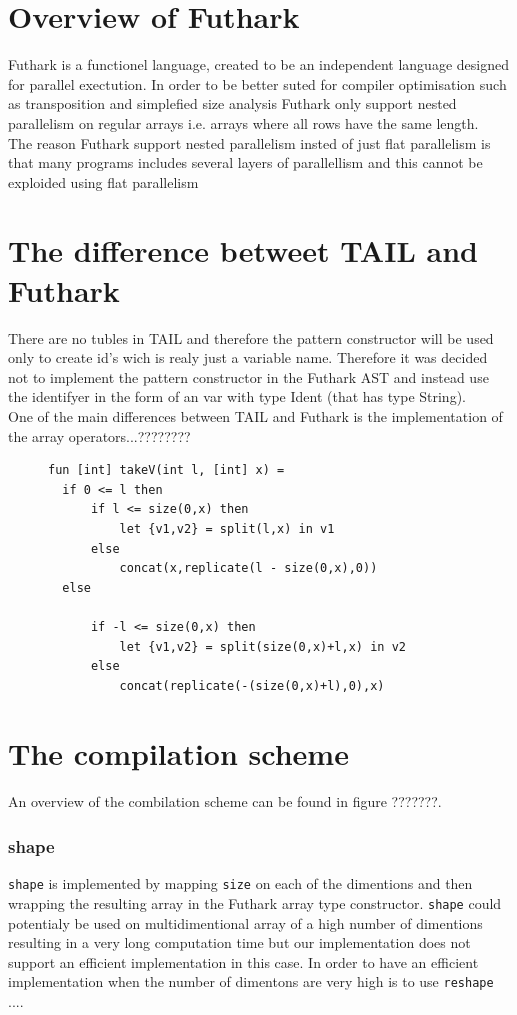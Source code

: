 \documentclass[11pt]{article}
\begin{document}
\section{Overview of Futhark}
Futhark is a functionel language, created to be an independent language designed for parallel exectution. In order to be better suted for compiler optimisation such as transposition and simplefied size analysis Futhark only support nested parallelism on regular arrays i.e. arrays where all rows have the same length.\\

The reason Futhark support nested parallelism insted of just flat parallelism is that many programs includes several layers of parallellism and this cannot be exploided using flat parallelism %

\section{The difference betweet TAIL and Futhark}
There are no tubles in TAIL and therefore the pattern constructor will be used only to create id's wich is realy just a variable name. Therefore it was decided not to implement the pattern constructor in the Futhark AST and instead use the identifyer in the form of an var with type Ident (that has type String). \\

One of the main differences between TAIL and Futhark is the implementation of the array operators...???????? \\
\begin{figure}
\begin{lstlisting}
fun [int] takeV(int l, [int] x) =
  if 0 <= l then
      if l <= size(0,x) then
          let {v1,v2} = split(l,x) in v1
      else
          concat(x,replicate(l - size(0,x),0))
  else
  
      if -l <= size(0,x) then
          let {v1,v2} = split(size(0,x)+l,x) in v2
      else
          concat(replicate(-(size(0,x)+l),0),x)
\end{lstlisting}
\end{figure}
\section{The compilation scheme}
An overview of the combilation scheme can be found in figure ???????. 

\subsubsection{shape}
\verb|shape| is implemented by mapping \verb|size| on each of the dimentions and then wrapping the resulting array in the Futhark array type constructor. 
\verb|shape| could potentialy be used on multidimentional array of a high number of dimentions resulting in a very long computation time but our implementation does not support an efficient implementation in this case. In order to have an efficient implementation when the number of dimentons are very high is to use \verb|reshape| .... \\
\end{document}
